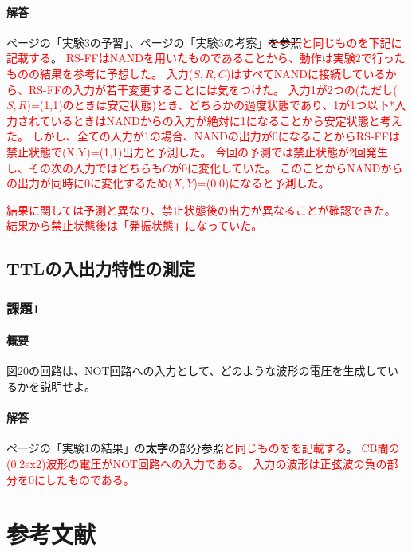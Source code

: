 \documentclass[dvipdfmx]{jsarticle}
\newcommand{\Add}[1]{\textcolor{red}{#1}}
\newcommand{\Erase}[1]{\textcolor{red}{\sout{\textcolor{black}{#1}}}}
\newcommand{\ctext}[1]{\raise0.2ex\hbox{\textcircled{\scriptsize{#1}}}}
\begin{document}
\paragraph{解答}
ページ\pageref*{yosoku1}の「実験3の予習」、ページ\pageref{kousatu}の「実験3の考察」\Erase{を参照}\Add{と同じものを下記に記載する}。
\Add{
  RS-FFはNANDを用いたものであることから、動作は実験2で行ったものの結果を参考に予想した。
入力($S,R,C$)はすべてNANDに接続しているから、RS-FFの入力が若干変更することには気をつけた。
入力1が2つの(ただし($S,R$)=(1,1)のときは安定状態)とき、どちらかの過度状態であり、1が1つ以下*入力されているときはNANDからの入力が絶対に1になることから安定状態と考えた。
しかし、全ての入力が1の場合、NANDの出力が0になることからRS-FFは禁止状態で(X,Y)=(1,1)出力と予測した。
今回の予測では禁止状態が2回発生し、その次の入力ではどちらも$C$が0に変化していた。
このことからNANDからの出力が同時に0に変化するため($X,Y$)=(0,0)になると予測した。
}

\Add{結果に関しては予測と異なり、禁止状態後の出力が異なることが確認できた。
結果から禁止状態後は「発振状態」になっていた。}

\subsection{TTLの入出力特性の測定}

\subsubsection{課題1}

\paragraph{概要}
図20の回路は、NOT回路への入力として、どのような波形の電圧を生成しているかを説明せよ。

\paragraph{解答}
ページ\pageref*{kekka}の「実験1の結果」の\textbf{太字}の部分\Erase{参照}\Add{と同じものをを記載する}。
\Add{CB間の(\ctext{2})波形の電圧がNOT回路への入力である。
入力の波形は正弦波の負の部分を0にしたものである。}

\section{参考文献}
\end{document}
